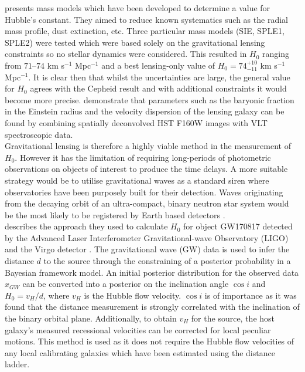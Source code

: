 \documentclass[12pt, onecolumn]{revtex4}    %
\begin{document}
\cite{2003ApJ...599...70K} presents mass models which have been developed to determine a value for Hubble's constant. They aimed to reduce known systematics such as the radial mass profile, dust extinction, etc. Three particular mass models (SIE, SPLE1, SPLE2) were tested which were based solely on the gravitational lensing constraints so no stellar dynamics were considered. This resulted in $H_0$ ranging from $71$--$74$ km s$^{-1}$ Mpc$^{-1}$ and a best lensing-only value of $H_0=74^{+10}_{-11}$ km s$^{-1}$ Mpc$^{-1}$. It is clear then that whilst the uncertainties are large, the general value for $H_0$ agrees with the Cepheid result and with additional constraints it would become more precise. \cite{2011A&A...536A..53C} demonstrate that parameters such as the baryonic fraction in the Einstein radius and the velocity dispersion of the lensing galaxy can be found by combining spatially deconvolved HST F160W images with VLT spectroscopic data. \\

Gravitational lensing is therefore a highly viable method in the measurement of $H_0$. However it has the limitation of requiring long-periods of photometric observations on objects of interest to produce the time delays. A more suitable strategy would be to utilise gravitational waves as a standard siren where observatories have been purposely built for their detection. Waves originating from the decaying orbit of an ultra-compact, binary neutron star system would be the most likely to be registered by Earth based detectors \citep{Schutz:1986aa}. \\

\cite{2017Natur.551...85A} describes the approach they used to calculate $H_0$ for object GW170817 detected by the Advanced Laser Interferometer Gravitational-wave Observatory (LIGO) \citep{2015CQGra..32g4001L} and the Virgo detector \citep{2015CQGra..32b4001A}. The gravitational wave (GW) data is used to infer the distance $d$ to the source through the constraining of a posterior probability in a Bayesian framework model. An initial posterior distribution for the observed data $x_{GW}$ can be converted into a posterior on the inclination angle $\cos{i}$ and $H_0=v_H/d$, where $v_H$ is the Hubble flow velocity. $\cos{i}$ is of importance as it was found that the distance measurement is strongly correlated with the inclination of the binary orbital plane. Additionally, to obtain $v_H$ for the source, the host galaxy's measured recessional velocities can be corrected for local peculiar motions. This method is used as it does not require the Hubble flow velocities of any local calibrating galaxies which have been estimated using the distance ladder. \\
\end{document}
